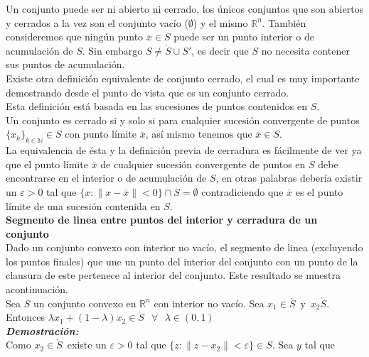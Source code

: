 Un conjunto puede ser ni abierto ni cerrado, los \'unicos conjuntos que son abiertos y cerrados a la vez son el conjunto vac\'io
($\emptyset$) y el mismo $\mathbb{R}^n$. Tambi\'en consideremos que ning\'un punto $\overline{x} \in S$ puede ser un punto interior o de 
acumulaci\'on de $S$. Sin embargo $S \neq \mathring{S} \cup S'$, es decir que $S$ no necesita contener sus puntos de acumulaci\'on.\\ 

Existe otra definici\'on equivalente de conjunto cerrado, el cual es muy importante demostrando desde el punto de vista que es un
conjunto cerrado.\\Esta definici\'on est\'a basada en las sucesiones de puntos contenidos en $S$. \\
Un conjunto es cerrado si y solo si para cualquier sucesi\'on convergente de puntos $\{ x_k \} _{k \in \mathbb{N}} \in S$ con punto
l\'imite $\overline{x}$, as\'i mismo tenemos que $\overline{x} \in S$.\\
La equivalencia de \'esta y la definici\'on previa de cerradura es f\'acilmente de ver ya que el punto l\'imite $\overline{x}$ de 
cualquier sucesi\'on convergente de puntos en $S$ debe encontrarse en el interior o de acumulaci\'on de $S$, en otras palabras
deber\'ia existir un $\varepsilon > 0$ tal que $\{x: \parallel x - \overline{x} \parallel < 0 \} \cap S = \emptyset$ contradiciendo
que $\overline{x}$ es el punto l\'imite de una sucesi\'on contenida en $S$.\\


\textbf{Segmento de linea entre puntos del interior y cerradura de un conjunto \cite{no-lineal}}\\

Dado un conjunto convexo con interior no vac\'io, el segmento de linea (excluyendo los puntos finales) que une un punto del interior
del conjunto con un punto de la clausura de este pertenece al interior del conjunto. Este resultado se muestra acontinuaci\'on.\\


{\teorema Sea $S$ un conjunto convexo en $\mathbb{R}^n$ con interior no vac\'io. Sea $x_1 \in \overline{S}\,$ y $\, x_2 \mathring{S}$.
Entonces $\lambda x_1 + (1 - \lambda)x_2 \in \mathring{S}~\,\,\, \forall \,\,\,\, \lambda \in (0, 1)$ \label{t_int}}\\

\textbf{\itshape Demostraci\'on: }\\
Como $x_2 \in \mathring{S}\,$ existe un $\varepsilon > 0$ tal que $\{z: \parallel z - x_2 \parallel < \varepsilon\} \in S$. Sea $y$ tal que

